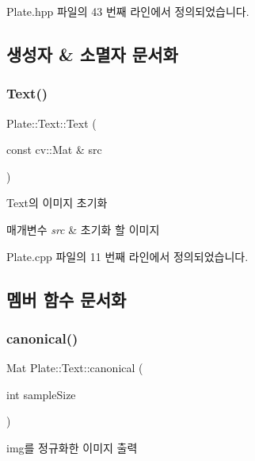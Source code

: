 Plate.\+hpp 파일의 43 번째 라인에서 정의되었습니다.



\subsection{생성자 \& 소멸자 문서화}
\mbox{\label{class_plate_1_1_text_a7d9cc837bb93e89f5b8bd6aee6cd578b}} 
\subsubsection{\texorpdfstring{Text()}{Text()}}
{\footnotesize\ttfamily Plate\+::\+Text\+::\+Text (\begin{DoxyParamCaption}\item[{const cv\+::\+Mat \&}]{src }\end{DoxyParamCaption})}



Text의 이미지 초기화 


\begin{DoxyParams}{매개변수}
{\em src} & 초기화 할 이미지 \\
\hline
\end{DoxyParams}


Plate.\+cpp 파일의 11 번째 라인에서 정의되었습니다.



\subsection{멤버 함수 문서화}
\mbox{\label{class_plate_1_1_text_a1fc8fd54d9274fac2740737f7b1e572e}} 
\subsubsection{\texorpdfstring{canonical()}{canonical()}}
{\footnotesize\ttfamily Mat Plate\+::\+Text\+::canonical (\begin{DoxyParamCaption}\item[{int}]{sample\+Size }\end{DoxyParamCaption})}



img를 정규화한 이미지 출력 


